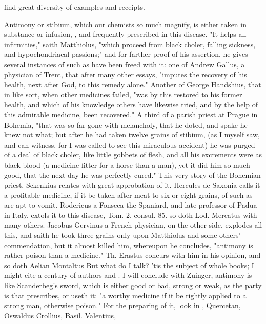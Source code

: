{find great diversity of examples and receipts.

Antimony or stibium, which our chemists so much magnify, is either taken in substance or infusion, \etc{}, and frequently prescribed in this disease. "It helps all infirmities," saith Matthiolus, "which proceed from black choler, falling sickness, and hypochondriacal passions;" and for farther proof of his assertion, he gives several instances of such as have been freed with it: one of Andrew Gallus, a physician of Trent, that after many other essays, "imputes the recovery of his health, next after God, to this remedy alone." Another of George Handshius, that in like sort, when other medicines failed, "was by this restored to his former health, and which of his knowledge others have likewise tried, and by the help of this admirable medicine, been recovered." A third of a parish priest at Prague in Bohemia, "that was so far gone with melancholy, that he doted, and spake he knew not what; but after he had taken twelve grains of stibium, (as I myself saw, and can witness, for I was called to see this miraculous accident) he was purged of a deal of black choler, like little gobbets of flesh, and all his excrements were as black blood (a medicine fitter for a horse than a man), yet it did him so much good, that the next day he was perfectly cured." This very story of the Bohemian priest, Sckenkius relates  with great approbation of it. Hercules de Saxonia calls it a profitable medicine, if it be taken after meat to six or eight grains, of such as are apt to vomit. Rodericus a Fonseca the Spaniard, and late professor of Padua in Italy, extols it to this disease, Tom. 2. consul. 85. so doth Lod. Mercatus  with many others. Jacobus Gervinus a French physician, on the other side,  explodes all this, and saith he took three grains only upon Matthiolus and some others' commendation, but it almost killed him, whereupon he concludes, "antimony is rather poison than a medicine." Th. Erastus concurs with him in his opinion, and so doth Aelian Montaltus  But what do I talk? 'tis the subject of whole books; I might cite a century of authors  and . I will conclude with Zuinger, antimony is like Scanderbeg's sword, which is either good or bad, strong or weak, as the party is that prescribes, or useth it: "a worthy medicine if it be rightly applied to a strong man, otherwise poison." For the preparing of it, look in , Quercetan, Oswaldus Crollius, Basil.  Valentius, \etc{}

}
